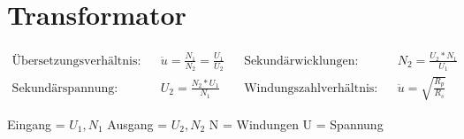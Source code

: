 \section*{Transformator}



\begin{tcolorbox}[colback=white,top=0pt]
    \begin{align*}
        \text{Übersetzungsverhältnis:} &  & \ddot{u} = \frac{N_1}{N_2} = \frac{U_1}{U_2} &  &
        \text{Sekundärwicklungen:}     &  & N_2 = \frac{U_2 * N_1}{U_1}            \\
        \text{Sekundärspannung:}       &  & U_2 = \frac{N_2 * U_1}{N_1}       &  &
        \text{Windungszahlverhältnis:} &  & \ddot{u} = \sqrt{\frac{R_p}{R_s}}
    \end{align*}
    \tcblower
    \begin{center}
        Eingang = \(U_1, N_1\) Ausgang = \(U_2, N_2\) \hspace{5em}  N = Windungen U = Spannung\
    \end{center}
\end{tcolorbox}